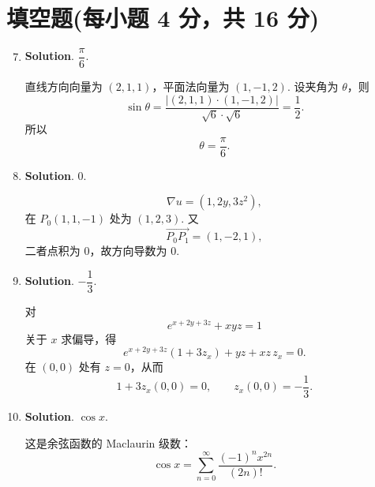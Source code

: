 \documentclass[../Main.tex]{subfiles}
\begin{document}
\section{填空题(每小题 4 分，共 16 分)}
\begin{enumerate}
    \setcounter{enumi}{6}
    \item \textbf{Solution}. $\dfrac{\pi}{6}$.

          直线方向向量为 \((2,1,1)\)，平面法向量为 \((1,-1,2)\). 设夹角为 \(\theta\)，则
          \[
              \sin\theta=\frac{|(2,1,1)\cdot(1,-1,2)|}{\sqrt6\cdot\sqrt6}=\frac12.
          \]
          所以
          \[
              \theta=\frac{\pi}{6}.
          \]

    \item \textbf{Solution}. $0$.

          \[
              \nabla u=(1,2y,3z^2),
          \]
          在 \(P_0(1,1,-1)\) 处为 \((1,2,3)\). 又
          \[
              \overrightarrow{P_0P_1}=(1,-2,1),
          \]
          二者点积为 \(0\)，故方向导数为 \(0\).

    \item \textbf{Solution}. $-\dfrac13$.

          对
          \[
              e^{x+2y+3z}+xyz=1
          \]
          关于 \(x\) 求偏导，得
          \[
              e^{x+2y+3z}(1+3z_x)+yz+xz\,z_x=0.
          \]
          在 \((0,0)\) 处有 \(z=0\)，从而
          \[
              1+3z_x(0,0)=0,\qquad z_x(0,0)=-\frac13.
          \]

    \item \textbf{Solution}. $\cos x$.

          这是余弦函数的 Maclaurin 级数：
          \[
              \cos x=\sum_{n=0}^{\infty}\frac{(-1)^n x^{2n}}{(2n)!}.
          \]
\end{enumerate}
\end{document}
